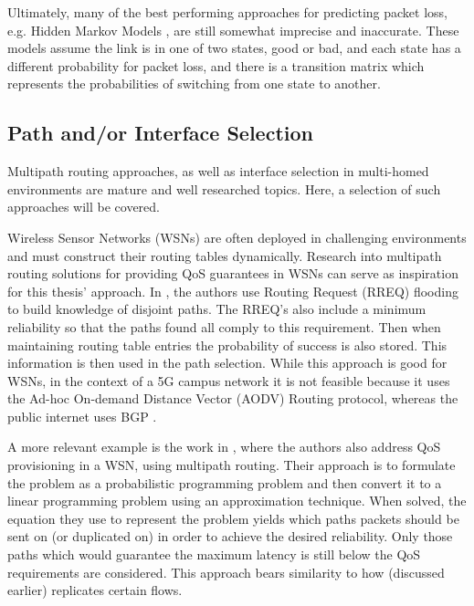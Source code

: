 Ultimately, many of the best performing approaches for predicting packet loss, e.g. Hidden Markov Models \cite{tao2004exploring, bremler2002predicting}, are still somewhat imprecise and inaccurate. These models assume the link is in one of two states, good or bad, and each state has a different probability for packet loss, and there is a transition matrix which represents the probabilities of switching from one state to another.

\subsection{Path and/or Interface Selection}

Multipath routing approaches, as well as interface selection in multi-homed environments are mature and well researched topics. Here, a selection of such approaches will be covered.

Wireless Sensor Networks (WSNs) are often deployed in challenging environments and must construct their routing tables dynamically. Research into multipath routing solutions for providing QoS guarantees in WSNs can serve as inspiration for this thesis' approach. In \cite{alwan2010multi}, the authors use Routing Request (RREQ) flooding to build knowledge of disjoint paths. The RREQ's also include a minimum reliability so that the paths found all comply to this requirement. Then when maintaining routing table entries the probability of success is also stored. This information is then used in the path selection. While this approach is good for WSNs, in the context of a 5G campus network it is not feasible because it uses the Ad-hoc On-demand Distance Vector (AODV) Routing \cite{perkins2003rfc3561} protocol, whereas the public internet uses BGP \cite{rekhter2006border}.

A more relevant example is the work in \cite{huang2008multiconstrained}, where the authors also address QoS provisioning in a WSN, using multipath routing. Their approach is to formulate the problem as a probabilistic programming problem and then convert it to a linear programming problem using an approximation technique. When solved, the equation they use to represent the problem yields which paths packets should be sent on (or duplicated on) in order to achieve the desired reliability. Only those paths which would guarantee the maximum latency is still below the QoS requirements are considered. This approach bears similarity to how \cite{prados2021asynchronous} (discussed earlier) replicates certain flows.

